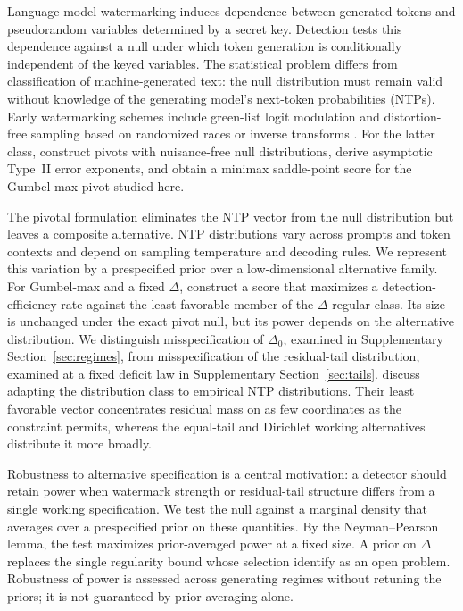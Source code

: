 \documentclass[11pt]{article}
\begin{document}
Language-model watermarking induces dependence between generated tokens and pseudorandom variables determined by a secret key.  Detection tests this dependence against a null under which token generation is conditionally independent of the keyed variables.  The statistical problem differs from classification of machine-generated text: the null distribution must remain valid without knowledge of the generating model's next-token probabilities (NTPs).  Early watermarking schemes include green-list logit modulation \citep{kirchenbauer2023watermark} and distortion-free sampling based on randomized races \citep{aaronson2023watermarking} or inverse transforms \citep{kuditipudi2024robust}.  For the latter class, \citet{li2025framework} construct pivots with nuisance-free null distributions, derive asymptotic Type~II error exponents, and obtain a minimax saddle-point score for the Gumbel-max pivot studied here.

The pivotal formulation eliminates the NTP vector from the null distribution but leaves a composite alternative.  NTP distributions vary across prompts and token contexts and depend on sampling temperature and decoding rules.  We represent this variation by a prespecified prior over a low-dimensional alternative family.  For Gumbel-max and a fixed $\Delta$, \citet{li2025framework} construct a score that maximizes a detection-efficiency rate against the least favorable member of the $\Delta$-regular class.  Its size is unchanged under the exact pivot null, but its power depends on the alternative distribution.  We distinguish misspecification of $\Delta_0$, examined in Supplementary Section~\ref{sec:regimes}, from misspecification of the residual-tail distribution, examined at a fixed deficit law in Supplementary Section~\ref{sec:tails}.  \citet{li2025framework} discuss adapting the distribution class to empirical NTP distributions.  Their least favorable vector concentrates residual mass on as few coordinates as the constraint permits, whereas the equal-tail and Dirichlet working alternatives distribute it more broadly.

Robustness to alternative specification is a central motivation: a detector should retain power when watermark strength or residual-tail structure differs from a single working specification.  We test the null against a marginal density that averages over a prespecified prior on these quantities.  By the Neyman--Pearson lemma, the test maximizes prior-averaged power at a fixed size.  A prior on $\Delta$ replaces the single regularity bound whose selection \citet{li2025framework} identify as an open problem.  Robustness of power is assessed across generating regimes without retuning the priors; it is not guaranteed by prior averaging alone.
\end{document}
